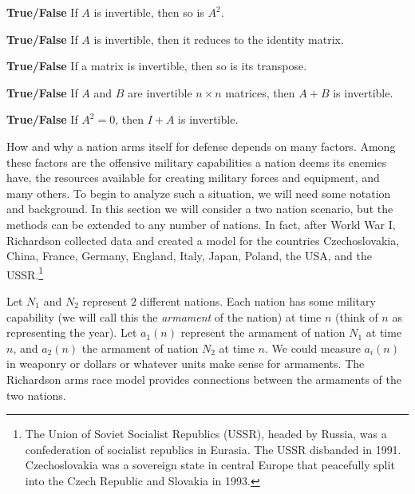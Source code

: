 \item \textbf{True/False} If $A$ is invertible, then so is $A^2$.

\item \textbf{True/False} If $A$ is invertible, then it reduces to the identity matrix.

\item \textbf{True/False} If a matrix is invertible, then so is its transpose.

\item \textbf{True/False} If $A$ and $B$ are invertible $n\times n$ matrices, then $A+B$ is invertible.

\item \textbf{True/False} If $A^2=0$, then $I+A$ is invertible.

\ea
\ee


\label{sec:proj_arms_race}

How and why a nation arms itself for defense depends on many factors. Among these factors are the offensive military capabilities a nation deems its enemies have, the resources available for creating military forces and equipment, and many others. To begin to analyze such a situation, we will need some notation and background. In this section we will consider a two nation scenario, but the methods can be extended to any number of nations. In fact, after World War I, Richardson collected data and created a model for the countries Czechoslovakia, China, France, Germany, England, Italy, Japan, Poland, the USA, and the USSR.\footnote{The Union of Soviet Socialist Republics (USSR), headed by Russia, was a confederation of socialist republics in Eurasia. The USSR disbanded in 1991. Czechoslovakia was a sovereign state in central Europe that peacefully split into the Czech Republic and Slovakia in 1993.}

Let $N_1$ and $N_2$ represent $2$ different nations. Each nation has some military capability (we will call this the \emph{armament} of the nation) at time $n$ (think of $n$ as representing the year). Let $a_1(n)$ represent the armament of nation $N_1$ at time $n$, and $a_2(n)$ the armament of nation $N_2$ at time $n$. We could measure $a_i(n)$ in weaponry or dollars or whatever units make sense for armaments. The Richardson arms race model provides connections between the armaments of the two nations. 

